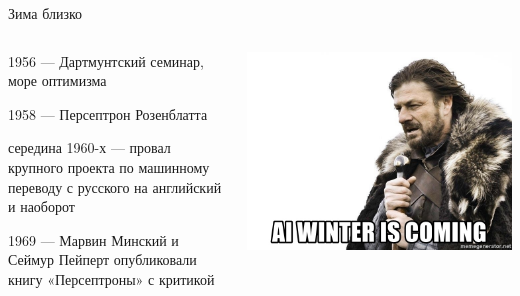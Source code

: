 \documentclass[notes,12pt, aspectratio=169]{beamer}
\newenvironment{wideitemize}{\itemize\addtolength{\itemsep}{10pt}}{\enditemize}
\begin{document}
\begin{frame}{Зима близко}
	\begin{columns}[T]%
		\begin{column}{.55\textwidth}%
		\begin{wideitemize}
		\item 1956 — Дартмунтский семинар, море оптимизма

		\item 1958 — Персептрон Розенблатта

		\item середина 1960-х — провал крупного проекта по машинному переводу с русского на английский и наоборот

		\item 1969 — Марвин Минский и Сеймур Пейперт опубликовали книгу «Персептроны» с критикой

		\end{wideitemize}
		\end{column}%
		\hfill%
		\begin{column}{.45\textwidth}
		\begin{center}
		\includegraphics[width=.99\linewidth]{stark.jpg}
		\end{center}
		\end{column}%
	\end{columns}%
\end{frame}
\end{document}
